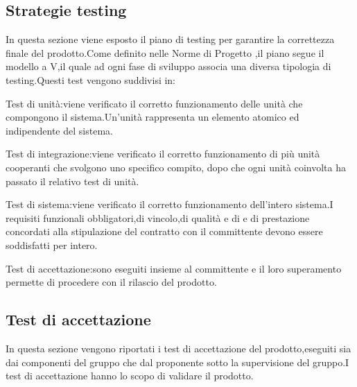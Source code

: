 \subsection{Strategie testing}
In questa sezione viene esposto il piano di testing per garantire la correttezza finale del prodotto.Come definito nelle Norme di Progetto ,il piano segue il modello a V,il quale ad ogni fase di sviluppo associa una diversa tipologia di testing.Questi test vengono suddivisi in:

Test di unità:viene verificato il corretto funzionamento delle unità che compongono il sistema.Un'unità rappresenta un elemento atomico ed indipendente del sistema.

Test di integrazione:viene verificato il corretto funzionamento di più unità cooperanti
che svolgono uno specifico compito, dopo che ogni unità coinvolta ha passato il relativo test di unità.

Test di sistema:viene verificato il corretto funzionamento dell’intero sistema.I requisiti funzionali obbligatori,di vincolo,di qualità e di e di prestazione concordati alla stipulazione del contratto con il committente devono essere soddisfatti per intero.


Test di accettazione:sono eseguiti insieme al  committente e il loro superamento permette di procedere con il rilascio del prodotto. 

\subsection{Test di accettazione}

In questa sezione vengono riportati i test di accettazione del prodotto,eseguiti sia dai componenti del gruppo che dal proponente sotto la supervisione del gruppo.I test di accettazione hanno lo scopo di validare il prodotto.

